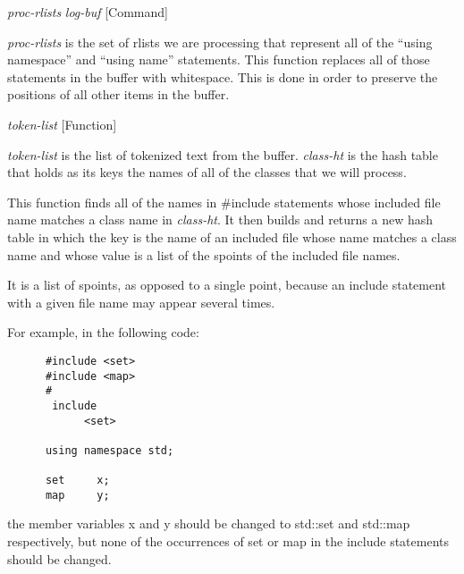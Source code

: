 \vspace{1em}
\noindent
{}
\usebox{\funcname}\emph{proc-rlists} \emph{log-buf}
 \hfill [Command]

\begin{doc-string}
\emph{proc-rlists} is the set of rlists we are processing that represent all of the
``using namespace'' and ``using name'' statements.  This function replaces all
of those statements in the buffer with whitespace.  This is done in order to
preserve the positions of all other items in the buffer.
\end{doc-string}

\vspace{1em}
\noindent
{}
\usebox{\funcname}\emph{token-list}
 \hfill [Function]
\hspace*{\wd\funcname}

\begin{doc-string}
\emph{token-list} is the list of tokenized text from the buffer.  \emph{class-ht} is the
hash table that holds as its keys the names of all of the classes that we will
process.

This function finds all of the names in \#include statements whose included file
name matches a class name in \emph{class-ht}.  It then builds and returns a new hash
table in which the key is the name of an included file whose name matches a
class name and whose value is a list of the spoints of the included file names.

It is a list of spoints, as opposed to a single point, because an include
statement with a given file name may appear several times.

For example, in the following code:

\small{\begin{verbatim}
      #include <set>
      #include <map>
      #
       include
            <set>

      using namespace std;

      set     x;
      map     y;
\end{verbatim}}

the member variables x and y should be changed to std::set and std::map
respectively, but none of the occurrences of set or map in the include
statements should be changed.
\end{doc-string}

